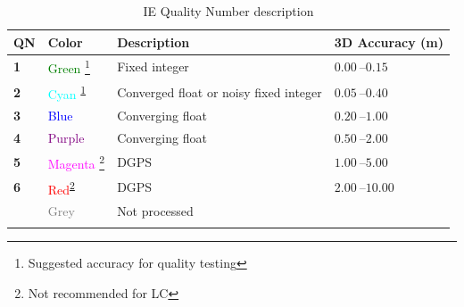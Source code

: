 \documentclass[british]{book}
\begin{document}
\begin{table}[h]
\centering{}%
\begin{minipage}[t]{1\columnwidth}%
\begin{center}
\begin{tabular}{>{\centering}p{2cm}>{\centering}p{3cm}>{\centering}p{6cm}>{\centering}p{3cm}}
 \rowcolor{lightgray}\textbf{QN} & \textbf{Color} & \textbf{Description} & \textbf{3D Accuracy (m) }\tabularnewline
\midrule
\textbf{1} & \textcolor{green}{Green}%
\footnote{Suggested accuracy for quality testing\label{fn:Suggested-accuracy-QT}%
} & Fixed integer & $\SIrange[range-phrase=\,-\,]{0.00}{0.15}{}$\tabularnewline
\textbf{2} & \textcolor{cyan}{Cyan} \textsuperscript{\ref{fn:Suggested-accuracy-QT}} & Converged float or noisy fixed integer & $\SIrange[range-phrase=\,-\,]{0.05}{0.40}{}$\tabularnewline
\midrule
\textbf{3} & \textcolor{blue}{Blue} & Converging float & $\SIrange[range-phrase=\,-\,]{0.20}{1.00}{}$\tabularnewline
\textbf{4} & \textcolor{purple}{Purple} & Converging float & $\SIrange[range-phrase=\,-\,]{0.50}{2.00}{}$\tabularnewline
\midrule
\textbf{5} & \textcolor{magenta}{Magenta}%
\footnote{Not recommended for LC\label{fn:Not-recommended-LC}%
} & DGPS & $\SIrange[range-phrase=\,-\,]{1.00}{5.00}{}$\tabularnewline
\textbf{6} & \textcolor{red}{Red}\textsuperscript{\ref{fn:Not-recommended-LC}} & DGPS & $\SIrange[range-phrase=\,-\,]{2.00}{10.00}{}$\tabularnewline
\midrule
 & \textcolor{gray}{Grey} & Not processed & \tabularnewline
 \endrule
\end{tabular}\caption{IE Quality Number description\label{tab:Quality-Number-description}}
\par\end{center}%
\end{minipage}
\end{table}
\end{document}

